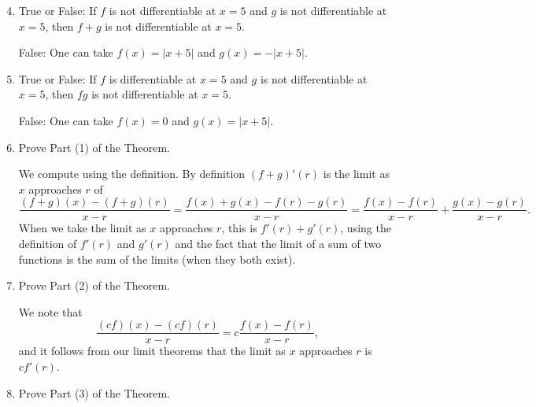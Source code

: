 \documentclass[12pt]{amsart}
\numberwithin{equation}{section}
\theoremstyle{plain} %
\theoremstyle{definition}
\theoremstyle{remark}
\begin{document}
\begin{enumerate}
\setcounter{enumi}{3}


 \item True or False: If $f$ is not differentiable at $x=5$ and $g$ is not differentiable at $x=5$, then $f+g$ is not differentiable at $x=5$.
 
 \begin{framed}
 False: One can take $f(x)=|x+5|$ and $g(x)=-|x+5|$.
 
 \end{framed}
 
  \item True or False: If $f$ is differentiable at $x=5$ and $g$ is not differentiable at $x=5$, then $fg$ is not differentiable at $x=5$.
 
  \begin{framed}
 False: One can take $f(x)=0$ and $g(x)=|x+5|$.
 \end{framed}
 
 \item Prove Part (1) of the Theorem.
 
 \begin{framed} 
We compute using the definition. By definition $(f+g)'(r)$ is the limit as $x$ approaches $r$ of \[ \frac{(f+g)(x) - (f+g)(r)}{x-r} = \frac{f(x) + g(x) - f(r) - g(r)}{x-r} = \frac{f(x)-f(r)}{x-r} + \frac{g(x) - g(r)}{x-r}.\] When we take the limit as $x$ approaches $r$, this is $f'(r) + g'(r)$, using the definition of $f'(r)$ and $g'(r)$ and the fact that the limit of a sum of two functions is the sum of the limits (when they both exist).
\end{framed}
 
 \item Prove Part (2) of the Theorem.
 
\begin{framed}
We note that \[ \frac{(cf)(x) - (cf)(r)}{x-r} = c \frac{f(x) - f(r)}{x-r},\] and it follows from our limit theorems that the limit as $x$ approaches $r$ is $cf'(r)$.
\end{framed}




 \item Prove Part (3) of the Theorem.
 

\end{enumerate}
\end{document}
